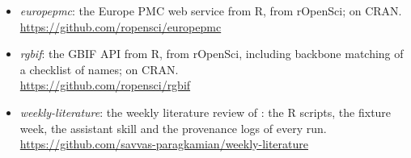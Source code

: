 \begin{itemize}
    on CRAN. An alternative to the hand-written calls of
    .\\
    \url{https://github.com/ropensci/openalexR}
  \item \emph{europepmc}: the Europe PMC web service from R, from rOpenSci;
    on CRAN.\\
    \url{https://github.com/ropensci/europepmc}
  \item \emph{rgbif}: the GBIF API from R, from rOpenSci, including backbone
    matching of a checklist of names; on CRAN.\\
    \url{https://github.com/ropensci/rgbif}
  \item \emph{weekly-literature}: the weekly literature review of
    : the R scripts, the fixture week, the
    assistant skill and the provenance logs of every run.\\
    \url{https://github.com/savvas-paragkamian/weekly-literature}
\end{itemize}

\endgroup
